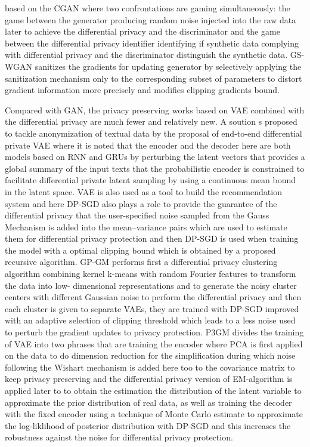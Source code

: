 \documentclass[conference]{IEEEtran}
\begin{document}
based on the CGAN where two confrontations are gaming simultaneously: the game between the generator producing random noise injected into the raw data later to achieve the differential privacy and the discriminator and the game between the differential privacy identifier identifying if synthetic data complying with differential privacy and the discriminator distinguish the synthetic data. GS-WGAN\cite{b16} sanitizes the gradients for updating generator by selectively applying the sanitization mechanism only to the corresponding subset of parameters to distort gradient information more precisely and modifies clipping gradients bound.

Compared with GAN, the privacy preserving works based on VAE combined with the differential privacy are much fewer and relatively new. A soution\cite{b17} s proposed to tackle anonymization of textual
data by the proposal of end-to-end differential private VAE
where it is noted that the encoder and the decoder here are both
models based on RNN and GRUs by perturbing the latent vectors that provides a global summary of the input texts that the probabilistic encoder is constrained to facilitate differential private latent sampling by using a continuous mean bound in the latent space. VAE is also used as a tool to build the recommendation system and here DP-SGD also plays a role to provide the guarantee of the differential privacy\cite{b18} that the user-specified noise sampled from the Gauss Mechanism is added into the mean–variance pairs which are used to estimate them for differential privacy protection and then DP-SGD is used when training the model with a optimal clipping bound which is obtained by a proposed recursive algorithm. GP-GM\cite{b19} performs first a differential privacy clustering algorithm combining kernel k-means with random Fourier features to transform the data into low-
dimensional representations and to generate the noisy cluster centers with different Gaussian noise to perform the differential privacy and then each cluster is given to separate VAEs, they are trained with DP-SGD improved with an adaptive selection of clipping threshold which leads to a less noise used to perturb the gradient updates to privacy protection. P3GM\cite{b20} divides the training of VAE into two phrases that are training the encoder where PCA is first applied on the data to do dimension reduction for the simplification during which noise following the Wishart mechanism is added here too to the covariance matrix to keep privacy preserving and the differential privacy version of EM-algorithm is applied later to to obtain the estimation the distribution of the latent variable to approximate the prior
distribution of real data, as well as training the decoder with the fixed encoder using a technique of Monte Carlo estimate to approximate the log-liklihood of posterior distribution with DP-SGD and this increases the robustness against the noise for differential privacy protection.
\end{document}
